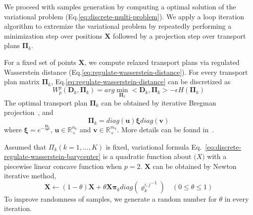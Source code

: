  We proceed with samples generation by computing a optimal solution of the variational problem (Eq.\ref{eq:discrete-multi-problem}).
 We apply a loop iteration algorithm to extremize the variational problem by repeatedly performing a minimization step over positions $\mathbf{X}$ followed by a projection step over transport plans $\mathbf{\Pi}_k$.

 For a fixed set of points $\mathbf X$,
 we compute  relaxed transport plans via regulated Wasserstein distance (Eq.\ref{eq:regulate-wasserstein-distance}).
 For every transport plan matrix $\mathbf{\Pi}_k$,
 Eq.\ref{eq:regulate-wasserstein-distance} can be discretized as
 \begin{equation}\label{eq:discrete-regulate-wasserstein-barycenter}
   W_p^p(\mathbf{D}_k,\mathbf{\Pi}_k)=arg\min\limits_{\mathbf{\Pi}_k}<\mathbf{D}_k,\mathbf{\Pi}_k>-\epsilon H(\mathbf{\Pi}_k)
 \end{equation}
The optimal transport plan $\mathbf{\Pi}_k$ can be obtained by iterative Bregman projection~\cite{cuturi:2013:sinkhorn,benamou:2015:iterative}, and
\begin{equation}\label{eq:transport-plan}
  \mathbf{\Pi}_k=diag(\mathbf{u})\mathbf{\xi}diag(\mathbf{v})
\end{equation}
where $\mathbf{\xi}=e^{-\frac{\mathbf{D}_k}{\epsilon}}$,
$\mathbf{u}\in \mathbb{R}_+^{n_k}$ and $\mathbf{v}\in\mathbb{R}_+^{m_k}$.
More details can be found in~\cite{cuturi:2013:sinkhorn,cuturi:2013:fast,benamou:2015:iterative}.

Assumed that $\Pi_k(k=1,...,K)$ is fixed,
variational formula Eq.~\ref{eq:discrete-regulate-wasserstein-barycenter}
is a quadratic function about $\mathbf(X)$ with a piecewise linear concave function when $p=2$.
$\mathbf{X}$ can be obtained by Newton iterative method,
\begin{equation}\label{eq:position-iterative}
  \mathbf{X}\leftarrow(1-\theta)\mathbf{X}+\theta\mathbf{X}\mathbf{\pi}_kdiag({\varrho_k^{i,j}}^{-1}) \quad (0\leq\theta\leq 1)
\end{equation}
To improve randomness of samples,
we generate a random number for $\theta$ in every iteration.


